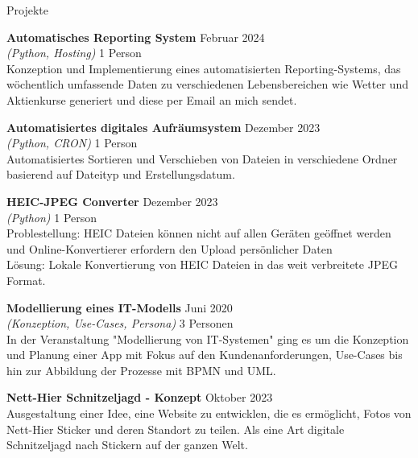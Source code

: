 \documentclass{resume} %
\begin{document}
\begin{rSection}{Projekte}
\begin{adjustwidth}{0.5cm}{}
        \item \textbf{Automatisches Reporting System} \hfill {Februar 2024} \\
        \textit{(Python, Hosting)} \hfill {1 Person}\\
        {Konzeption und Implementierung eines automatisierten Reporting-Systems, das wöchentlich umfassende Daten zu verschiedenen Lebensbereichen wie Wetter und Aktienkurse generiert und diese per Email an mich sendet.}
        
        \newpage 
        \item \textbf{Automatisiertes digitales Aufräumsystem} \hfill {Dezember 2023}\\ 
        \textit{(Python, CRON)} \hfill {1 Person}\\
        {Automatisiertes Sortieren und Verschieben von Dateien in verschiedene Ordner basierend auf Dateityp und Erstellungsdatum.}
        
        \item \textbf{HEIC-JPEG Converter} \hfill {Dezember 2023}\\
        \textit{(Python)} \hfill {1 Person}\\
        {Problestellung: HEIC Dateien können nicht auf allen Geräten geöffnet werden und Online-Konvertierer erfordern den Upload persönlicher Daten \\
        Lösung: Lokale Konvertierung von HEIC Dateien in das weit verbreitete JPEG Format.}
        
        \item \textbf{Modellierung eines IT-Modells} \hfill {Juni 2020} \\
        \textit{(Konzeption, Use-Cases, Persona)} \hfill {3 Personen}\\ 
        {In der Veranstaltung "Modellierung von IT-Systemen" ging es um die Konzeption und Planung einer App mit Fokus auf den Kundenanforderungen, Use-Cases bis hin zur Abbildung der Prozesse mit BPMN und UML.}
        
        \item \textbf{Nett-Hier Schnitzeljagd - Konzept} \hfill {Oktober 2023} \\
        {Ausgestaltung einer Idee, eine Website zu entwicklen, die es ermöglicht, Fotos von Nett-Hier Sticker und deren Standort zu teilen. Als eine Art digitale Schnitzeljagd nach Stickern auf der ganzen Welt.}
    
    \end{adjustwidth}
    
\end{rSection}
\end{document}
